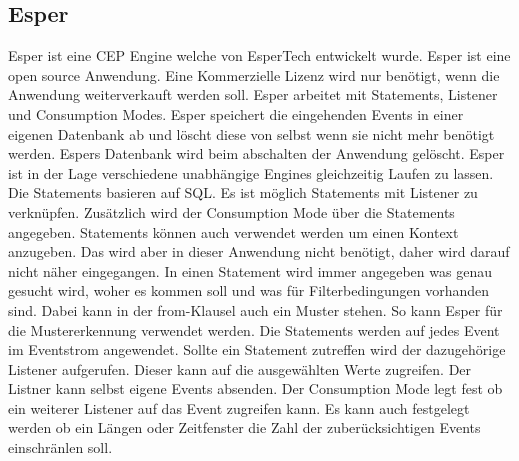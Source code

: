 \subsection{Esper}
Esper ist eine CEP Engine welche von EsperTech entwickelt wurde. Esper ist eine open source Anwendung. Eine Kommerzielle Lizenz wird nur benötigt, wenn die Anwendung weiterverkauft werden soll. Esper arbeitet mit Statements, Listener und Consumption Modes. Esper speichert die eingehenden Events in einer eigenen Datenbank ab und löscht diese von selbst wenn sie nicht mehr benötigt werden. Espers Datenbank wird beim abschalten der Anwendung gelöscht. Esper ist in der Lage verschiedene unabhängige Engines gleichzeitig Laufen zu lassen. 
\\ 
Die Statements basieren auf SQL. Es ist möglich Statements mit Listener zu verknüpfen. Zusätzlich wird der Consumption Mode über die Statements angegeben. Statements können auch verwendet werden um einen Kontext anzugeben. Das wird aber in dieser Anwendung nicht benötigt, daher wird darauf nicht näher eingegangen. In einen Statement wird immer angegeben was genau gesucht wird, woher es kommen soll und was für Filterbedingungen vorhanden sind. Dabei kann in der from-Klausel auch ein Muster stehen. So kann Esper für die Mustererkennung verwendet werden. Die Statements werden auf jedes Event im Eventstrom angewendet. Sollte ein Statement zutreffen wird der dazugehörige Listener aufgerufen. Dieser kann auf die ausgewählten Werte zugreifen. Der Listner kann selbst eigene Events absenden. Der Consumption Mode legt fest ob ein weiterer Listener auf das Event zugreifen kann. Es kann auch festgelegt werden ob ein Längen oder Zeitfenster die Zahl der zuberücksichtigen Events einschränlen soll.   

